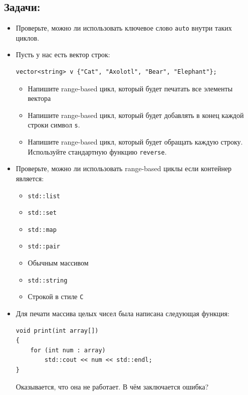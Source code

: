 \documentclass{article}
\begin{document}
\subsection*{Задачи:}
\begin{itemize}
\item Проверьте, можно ли использовать ключевое слово \texttt{auto} внутри таких циклов.
\item Пусть у нас есть вектор строк:
\begin{lstlisting}
vector<string> v {"Cat", "Axolotl", "Bear", "Elephant"};
\end{lstlisting}
\begin{itemize}
\item Напишите range-based цикл, который будет печатать все элементы вектора
\item Напишите range-based цикл, который будет добавлять в конец каждой строки символ \texttt{s}.
\item Напишите range-based цикл, который будет обращать каждую строку. Используйте стандартную функцию \texttt{reverse}.
\end{itemize}

\item Проверьте, можно ли использовать range-based циклы если контейнер является:
\begin{multicols}{2}
\begin{itemize}
\item \texttt{std::list}
\item \texttt{std::set}
\item \texttt{std::map}
\item \texttt{std::pair}
\item Обычным массивом
\item \texttt{std::string}
\item Строкой в стиле \texttt{C}
\end{itemize}
\end{multicols}

\item Для печати массива целых чисел была написана следующая функция:
\begin{lstlisting}
void print(int array[]) 
{
    for (int num : array)
        std::cout << num << std::endl;
}
\end{lstlisting}
Оказывается, что она не работает. В чём заключается ошибка?
\end{itemize}


\newpage
\end{document}
